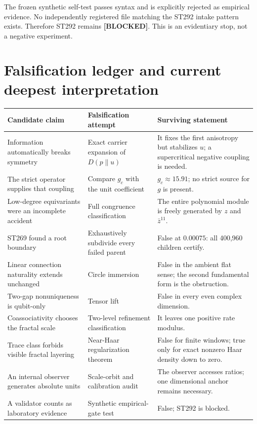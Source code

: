 \documentclass[11pt,a4paper]{article}
\newcommand{\Blocked}{\textcolor{blocked}{\textbf{[BLOCKED]}}}
\begin{document}
The frozen synthetic self-test passes syntax and is explicitly rejected as empirical
evidence. No independently registered file matching the ST292 intake pattern exists.
Therefore ST292 remains \Blocked. This is an evidentiary stop, not a negative experiment.

\section{Falsification ledger and current deepest interpretation}

\begin{longtable}{p{}p{}p{}}
\toprule
Candidate claim & Falsification attempt & Surviving statement \\
\midrule\endhead
Information automatically breaks symmetry & Exact carrier expansion of $D(p\|u)$ & It
fixes the first anisotropy but stabilizes $u$; a supercritical negative coupling is needed. \\
The strict operator supplies that coupling & Compare $g_c$ with the unit coefficient &
$g_c\approx15.91$; no strict source for $g$ is present. \\
Low-degree equivariants were an incomplete accident & Full congruence classification & The
entire polynomial module is freely generated by $z$ and $\bar z^{11}$. \\
ST269 found a root boundary & Exhaustively subdivide every failed parent & False at
$0.00075$: all 400,960 children certify. \\
Linear connection naturality extends unchanged & Circle immersion & False in the ambient
flat sense; the second fundamental form is the obstruction. \\
Two-gap nonuniqueness is qubit-only & Tensor lift & False in every even complex dimension. \\
Coassociativity chooses the fractal scale & Two-level refinement classification & It leaves
one positive rate modulus. \\
Trace class forbids visible fractal layering & Near-Haar regularization theorem & False for
finite windows; true only for exact nonzero Haar density down to zero. \\
An internal observer generates absolute units & Scale-orbit and calibration audit & The
observer accesses ratios; one dimensional anchor remains necessary. \\
A validator counts as laboratory evidence & Synthetic empirical-gate test & False; ST292 is
blocked. \\
\bottomrule
\end{longtable}
\end{document}
